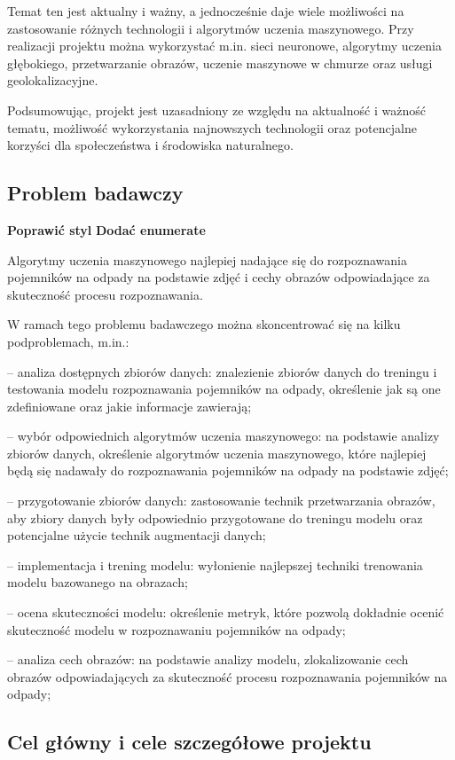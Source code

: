 \documentclass[12pt,oneside]{book}
\begin{document}
Temat ten jest aktualny i ważny, a jednocześnie daje wiele możliwości na zastosowanie różnych technologii i algorytmów uczenia maszynowego. Przy realizacji projektu można wykorzystać m.in. sieci neuronowe, algorytmy uczenia głębokiego, przetwarzanie obrazów, uczenie maszynowe w chmurze oraz usługi geolokalizacyjne.

Podsumowując, projekt \topic jest uzasadniony ze względu na aktualność i ważność tematu, możliwość wykorzystania najnowszych technologii oraz potencjalne korzyści dla społeczeństwa i środowiska naturalnego.

\subsection{Problem badawczy}

\textbf{Poprawić styl}
\textbf{Dodać enumerate}

Algorytmy uczenia maszynowego najlepiej nadające się do rozpoznawania pojemników na odpady na podstawie zdjęć i cechy obrazów odpowiadające za skuteczność procesu rozpoznawania.

W ramach tego problemu badawczego można skoncentrować się na kilku podproblemach, m.in.:

    -- analiza dostępnych zbiorów danych: znalezienie zbiorów danych do treningu i testowania modelu rozpoznawania pojemników na odpady, określenie jak są one zdefiniowane oraz jakie informacje zawierają;

    -- wybór odpowiednich algorytmów uczenia maszynowego: na podstawie analizy zbiorów danych, określenie algorytmów uczenia maszynowego, które najlepiej będą się nadawały do rozpoznawania pojemników na odpady na podstawie zdjęć;

    -- przygotowanie zbiorów danych: zastosowanie technik przetwarzania obrazów, aby zbiory danych były odpowiednio przygotowane do treningu modelu oraz potencjalne użycie technik augmentacji danych;

    -- implementacja i trening modelu: wyłonienie najlepszej techniki trenowania modelu bazowanego na obrazach;

    -- ocena skuteczności modelu: określenie metryk, które pozwolą dokładnie ocenić skuteczność modelu w rozpoznawaniu pojemników na odpady;

    -- analiza cech obrazów: na podstawie analizy modelu, zlokalizowanie cech obrazów odpowiadających za skuteczność procesu rozpoznawania pojemników na odpady;

\subsection{Cel główny i cele szczegółowe projektu}
\end{document}
